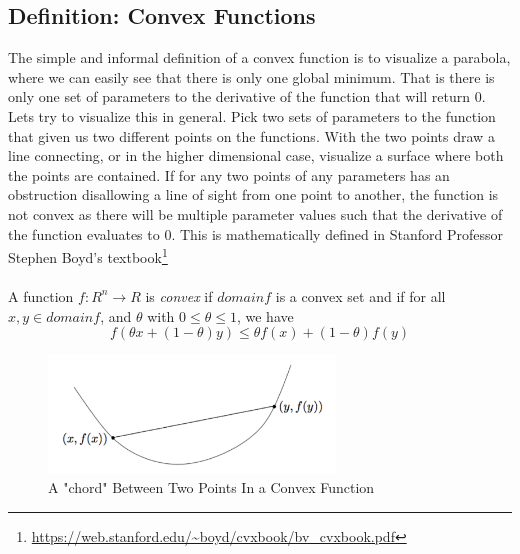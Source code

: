 \documentclass{article}
\theoremstyle{definition}
\begin{document}
\subsection{Definition: Convex Functions}
The simple and informal definition of a convex function is to visualize a parabola, where we can easily see that there is only one global minimum. That is there is only one set of parameters to the derivative of the function that will return 0. Lets try to visualize this in general. Pick two sets of parameters to the function that given us two different points on the functions. With the two points draw a line connecting, or in the higher dimensional case, visualize a surface where both the points are contained. If for any two points of any parameters has an obstruction disallowing a line of sight from one point to another, the function is not convex as there will be multiple parameter values such that the derivative of the function evaluates to 0. This is mathematically defined in Stanford Professor Stephen Boyd's textbook\footnote{\url{https://web.stanford.edu/~boyd/cvxbook/bv_cvxbook.pdf}} \\
\\
A function $f:R^n \rightarrow R$ is \textit{convex} if $domain f$ is a convex set and if for all $x,y \in domain f$, and $\theta$ with $0 \leq \theta \leq 1$, we have
\begin{equation}
    \label{simple_equation}
    f(\theta x + (1 - \theta)y) \leq \theta f(x) + (1 - \theta)f(y)
\end{equation}
\begin{figure}[ht]
    \centering
    \includegraphics[width=3.0in]{convexboyd}
    \caption{A "chord" Between Two Points In a Convex Function}
    \label{convexboyd}
\end{figure}
\end{document}
